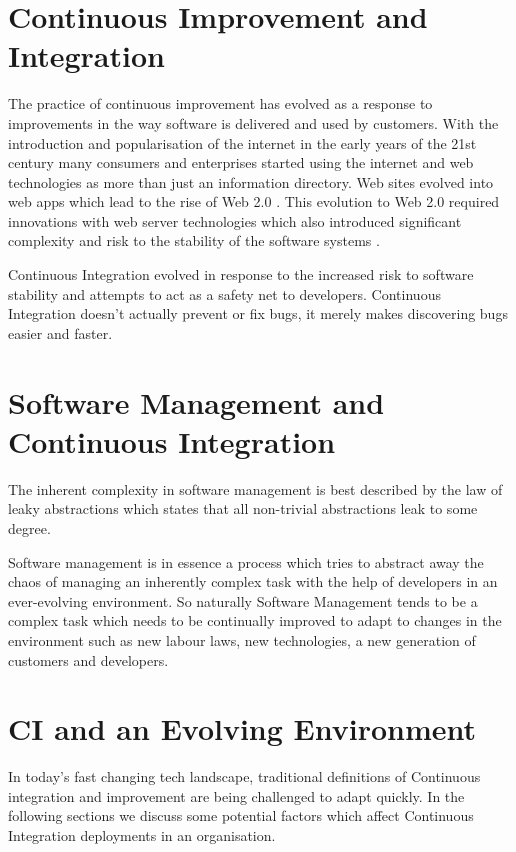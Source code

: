 \documentclass[10pt,conference]{IEEEtran}
\begin{document}
\section*{Continuous Improvement and Integration}

The practice of continuous improvement has evolved as a response to improvements in the way software is delivered and used by customers. With the introduction and popularisation of the internet in the early years of the 21st century many consumers and enterprises started using the internet and web technologies as more than just an information directory. Web sites evolved into web apps which lead to the rise of Web 2.0 \cite{oreilly_what_2007}. This evolution to Web 2.0 required innovations with web server technologies which also introduced significant complexity and risk to the stability of the software systems \cite{oreilly_what_2007}.

Continuous Integration evolved in response to the increased risk to software stability and attempts to act as a safety net \cite{fowler_continuous_2006} to developers. Continuous Integration doesn't actually prevent or fix bugs, it merely makes discovering bugs easier and faster. 

\section*{Software Management and Continuous Integration}

The inherent complexity in software management is best described by the law of leaky abstractions\cite{spolsky_law_2002} which states that all non-trivial abstractions leak to some degree. 

Software management is in essence a process which tries to abstract away the chaos of managing an inherently complex task with the help of developers in an ever-evolving environment. So naturally Software Management tends to be a complex task which needs to be continually improved to adapt to changes in the environment such as new labour laws, new technologies, a new generation of customers and developers. 

\section*{CI and an Evolving Environment}

In today's fast changing tech landscape, traditional definitions of Continuous integration and improvement are being challenged to adapt quickly. In the following sections we discuss some potential factors which affect Continuous Integration deployments in an organisation.
\end{document}
